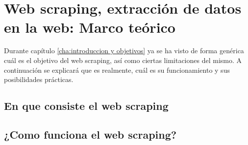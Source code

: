 
\chapter{Web scraping, extracción de datos en la web: Marco teórico}
\label{cha:web scraping, extraccion de datos en la web} 

Durante capítulo \ref{cha:introduccion y objetivos} ya se ha visto de forma genérica cuál es el objetivo
del web scraping, así como ciertas limitaciones del mismo. A continuación se explicará que es realmente,
cuál es su funcionamiento y sus posibilidades prácticas.

\section{En que consiste el web scraping}
\label{sec:en que consiste el web scraping}



\section{¿Como funciona el web scraping?}
\label{sec:Como funciona el web scraping}









